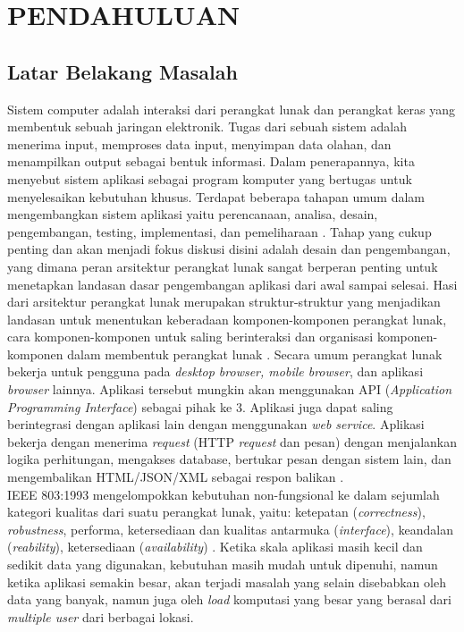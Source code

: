 \chapter{PENDAHULUAN}

\vspace{4.5pt}

\section{Latar Belakang Masalah} \label{sec:latar_belakang}
Sistem computer adalah interaksi dari perangkat lunak dan perangkat keras yang membentuk sebuah jaringan elektronik. Tugas dari sebuah sistem adalah menerima input, memproses data input, menyimpan data olahan, dan menampilkan output sebagai bentuk informasi. Dalam penerapannya, kita menyebut sistem aplikasi sebagai program komputer yang bertugas untuk menyelesaikan kebutuhan khusus. Terdapat beberapa tahapan umum dalam mengembangkan sistem aplikasi yaitu perencanaan, analisa, desain, pengembangan, testing, implementasi, dan pemeliharaan \cite{1}.  Tahap yang cukup penting dan akan menjadi fokus diskusi disini adalah desain dan pengembangan, yang dimana peran arsitektur perangkat lunak sangat berperan penting untuk menetapkan landasan dasar pengembangan aplikasi dari awal sampai selesai. Hasi dari arsitektur perangkat lunak merupakan struktur-struktur yang menjadikan landasan untuk menentukan keberadaan komponen-komponen perangkat lunak, cara komponen-komponen untuk saling berinteraksi dan organisasi komponen-komponen dalam membentuk perangkat lunak \cite{2}. Secara umum perangkat lunak bekerja untuk pengguna pada \textit{desktop browser, mobile browser}, dan aplikasi \textit{browser} lainnya. Aplikasi tersebut mungkin akan menggunakan API (\textit{Application Programming Interface}) sebagai pihak ke 3. Aplikasi juga dapat saling berintegrasi dengan aplikasi lain dengan menggunakan \textit{web service}. Aplikasi bekerja dengan menerima \textit{request} (HTTP \textit{request} dan pesan) dengan menjalankan logika perhitungan, mengakses database, bertukar pesan dengan sistem lain, dan mengembalikan  HTML/JSON/XML sebagai respon balikan \cite{4}.\\
IEEE 803:1993 mengelompokkan kebutuhan non-fungsional ke dalam sejumlah kategori kualitas dari suatu perangkat lunak, yaitu: ketepatan (\textit{correctness}), \textit{robustness}, performa, ketersediaan dan kualitas antarmuka (\textit{interface}), keandalan (\textit{reability}), ketersediaan (\textit{availability}) \cite{8}. Ketika skala aplikasi masih kecil dan sedikit data yang digunakan, kebutuhan masih mudah untuk dipenuhi, namun ketika aplikasi semakin besar, akan terjadi masalah yang selain disebabkan oleh data yang banyak, namun juga oleh \textit{load} komputasi yang besar yang berasal dari \textit{multiple user} dari berbagai lokasi.\\
